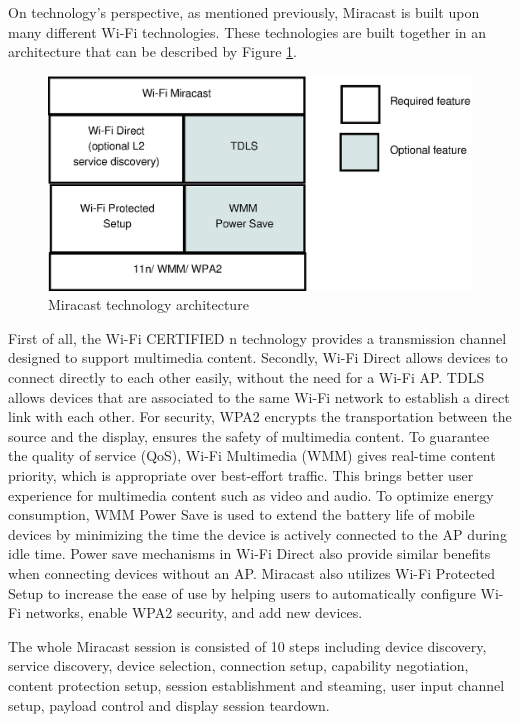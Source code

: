 On technology's perspective, as mentioned previously, Miracast is built upon
many different Wi-Fi technologies. These technologies are built together in an
architecture that can be described by Figure \ref{miracast_architect}.

\begin{figure}[htb] \centering 
\includegraphics[width=0.9\columnwidth]{charts/miracast_technology_architecture} 
\caption{Miracast technology architecture \label{miracast_architect}} 
\end{figure} 

First of all, the Wi-Fi CERTIFIED n technology provides a transmission channel
designed to support multimedia content. Secondly, Wi-Fi Direct allows devices to
connect directly to each other easily, without the need for a Wi-Fi AP. TDLS
allows devices that are associated to the same Wi-Fi network to establish a
direct link with each other. For security, WPA2 encrypts the transportation
between the source and the display, ensures the safety of multimedia content. To
guarantee the quality of service (QoS), Wi-Fi Multimedia (WMM) gives real-time
content priority, which is appropriate over best-effort traffic. This brings
better user experience for multimedia content such as video and audio. To
optimize energy consumption, WMM Power Save is used to extend the battery life
of mobile devices by minimizing the time the device is actively connected to
the AP during idle time. Power save mechanisms in Wi-Fi Direct also provide
similar benefits when connecting devices without an AP. Miracast also utilizes 
Wi-Fi Protected Setup to increase the ease of use by helping users to
automatically configure Wi-Fi networks, enable WPA2 security, and add new
devices.

The whole Miracast session is consisted of 10 steps including device discovery,
service discovery, device selection, connection setup, capability negotiation,
content protection setup, session establishment and steaming, user input
channel setup, payload control and display session teardown.

